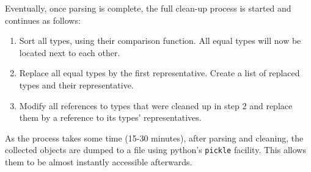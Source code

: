 \bigskip
Eventually, once parsing is complete, the full clean-up process is started and continues as follows:
\begin{enumerate}
	\item Sort all types, using their comparison function. All equal types will now be located next to each other.
	\item Replace all equal types by the first representative. Create a list of replaced types and their representative.
	\item Modify all references to types that were cleaned up in step 2 and replace them by a reference to its types’ representatives.
\end{enumerate}

As the process takes some time (15-30 minutes), after parsing and cleaning, the collected objects are dumped to a file using python’s \texttt{pickle} facility.
This allows them to be almost instantly accessible afterwards.
